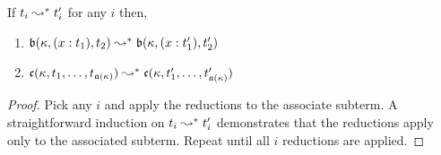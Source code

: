 \begin{lemma}
    If $t_i \leadsto^* t_i^\prime$ for any $i$ then,
    \begin{enumerate}
        \item $\mathfrak{b}(\kappa, (x : t_1), t_2) \leadsto^* \mathfrak{b}(\kappa, (x : t_1^\prime), t_2^\prime)$
        \item $\mathfrak{c}(\kappa, t_1,\ldots,t_{\mathfrak{a}(\kappa)}) \leadsto^* \mathfrak{c}(\kappa, t_1^\prime,\ldots,t_{\mathfrak{a}(\kappa)}^\prime)$
    \end{enumerate}
    \label{lem:2:beta_par}
\end{lemma}
\begin{proof}
    Pick any $i$ and apply the reductions to the associate subterm.
    A straightforward induction on $t_i \leadsto^* t_i^\prime$ demonstrates that the reductions apply only to the associated subterm.
    Repeat until all $i$ reductions are applied.
\end{proof}

